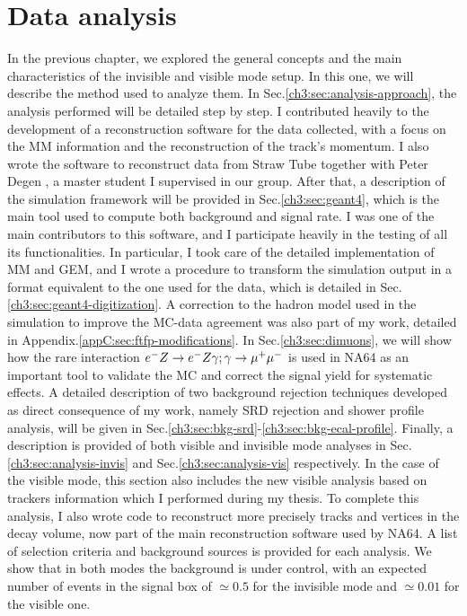 
\newcommand{\pdirthree}{chapters/plots/chapter3}

\chapter{Data analysis}
\label{chapter3}


In the previous chapter, we explored the general concepts and the main characteristics of the invisible and visible mode setup. In this one, we will describe the method used to analyze them. In Sec.\ref{ch3:sec:analysis-approach}, the analysis performed will be detailed step by step. I contributed heavily to the development of a reconstruction software for the data collected, with a focus on the MM information and the reconstruction of the track's momentum. I also wrote the software to reconstruct data from Straw Tube together with Peter Degen \cite{pdegen-thesis}, a master student I supervised in our group. After that, a description of the simulation framework will be provided in Sec.\ref{ch3:sec:geant4}, which is the main tool used to compute both background and signal rate. I was one of the main contributors to this software, and I participate heavily in the testing of all its functionalities. In particular, I took care of the detailed implementation of MM and GEM, and I wrote a procedure to transform the simulation output in a format equivalent to the one used for the data, which is detailed in Sec.\ref{ch3:sec:geant4-digitization}. A correction to the hadron model used in the simulation to improve the MC-data agreement was also part of my work, detailed in Appendix.\ref{appC:sec:ftfp-modifications}.
In Sec.\ref{ch3:sec:dimuons}, we will show how the rare interaction $e^- Z \to e^- Z \gamma; \gamma \to \mu^+ \mu^-$ is used in NA64 as an important tool to validate the MC and correct the signal yield for systematic effects.
A detailed description of two background rejection techniques developed as direct consequence of my work, namely SRD rejection and shower profile analysis, will be given in Sec.\ref{ch3:sec:bkg-srd}-\ref{ch3:sec:bkg-ecal-profile}.
Finally, a description is provided of both visible and invisible mode analyses in Sec.\ref{ch3:sec:analysis-invis} and Sec.\ref{ch3:sec:analysis-vis} respectively. In the case of the visible mode, this section also includes the new visible analysis based on trackers information which I performed during my thesis. To complete this analysis, I also wrote code to reconstruct more precisely tracks and vertices in the decay volume, now part of the main reconstruction software used by NA64.
A list of selection criteria and background sources is provided for each analysis. We show that in both modes the background is under control, with an expected number of events in the signal box of $\simeq 0.5$ for the invisible mode and $\simeq 0.01$ for the visible one.


